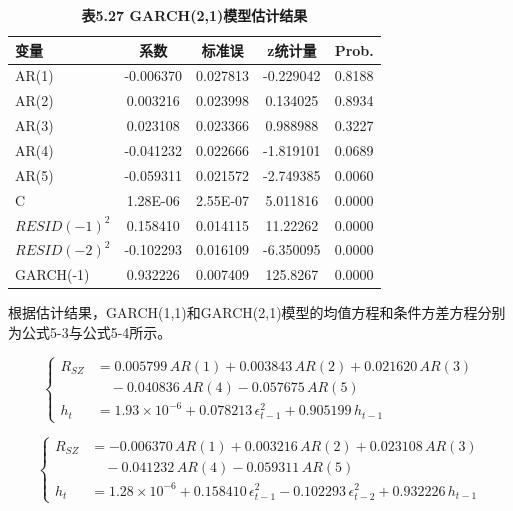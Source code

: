\documentclass[12pt, a4paper]{article}
\numberwithin{equation}{section}
\begin{document}
\begin{table}[h!]
    \centering
    \captionsetup{labelformat=empty}
    \caption{\textbf{\fontsize{9pt}{11pt}\selectfont 表5.27 GARCH(2,1)模型估计结果}}
    \begin{tabular}{lcccc}
        \toprule
        变量            & 系数        & 标准误      & z统计量      & Prob.  \\
        \midrule
        AR(1)         & -0.006370 & 0.027813 & -0.229042 & 0.8188 \\
        AR(2)         & 0.003216  & 0.023998 & 0.134025  & 0.8934 \\
        AR(3)         & 0.023108  & 0.023366 & 0.988988  & 0.3227 \\
        AR(4)         & -0.041232 & 0.022666 & -1.819101 & 0.0689 \\
        AR(5)         & -0.059311 & 0.021572 & -2.749385 & 0.0060 \\
        C             & 1.28E-06  & 2.55E-07 & 5.011816  & 0.0000 \\
        $RESID(-1)^2$ & 0.158410  & 0.014115 & 11.22262  & 0.0000 \\
        $RESID(-2)^2$ & -0.102293 & 0.016109 & -6.350095 & 0.0000 \\
        GARCH(-1)     & 0.932226  & 0.007409 & 125.8267  & 0.0000 \\
        \bottomrule
    \end{tabular}
\end{table}

根据估计结果，GARCH(1,1)和GARCH(2,1)模型的均值方程和条件方差方程分别为公式5-3与公式5-4所示。

\begin{equation}
    \left\{
    \begin{aligned}
        R_{SZ} & = 0.005799 \, AR(1) + 0.003843 \, AR(2) + 0.021620 \, AR(3)                \\
               & \quad - 0.040836 \, AR(4) - 0.057675 \, AR(5)                              \\
        h_t    & = 1.93 \times 10^{-6} + 0.078213 \, \epsilon_{t-1}^2 + 0.905199 \, h_{t-1}
    \end{aligned}
    \right. \tag{5-3}
\end{equation}

\begin{equation}
    \left\{
    \begin{aligned}
        R_{SZ} & = -0.006370 \, AR(1) + 0.003216 \, AR(2) + 0.023108 \, AR(3)                                              \\
               & \quad - 0.041232 \, AR(4) - 0.059311 \, AR(5)                                                             \\
        h_t    & = 1.28 \times 10^{-6} + 0.158410 \, \epsilon_{t-1}^2 - 0.102293 \, \epsilon_{t-2}^2 + 0.932226 \, h_{t-1}
    \end{aligned}
    \right. \tag{5-4}
\end{equation}
\end{document}
